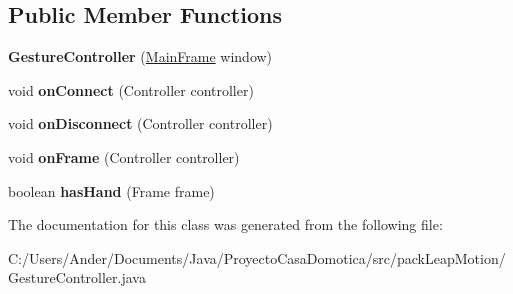 \subsection*{Public Member Functions}
\begin{DoxyCompactItemize}
\item 
\mbox{\label{classpack_leap_motion_1_1_gesture_controller_a8315f6be678b327266d0c3926ce26133}} 
{\bfseries Gesture\+Controller} (\mbox{\hyperlink{classpack_interface_1_1_main_frame}{Main\+Frame}} window)
\item 
\mbox{\label{classpack_leap_motion_1_1_gesture_controller_a9998ec8be3ea657d06cf775c02388d9f}} 
void {\bfseries on\+Connect} (Controller controller)
\item 
\mbox{\label{classpack_leap_motion_1_1_gesture_controller_a1cdf76d24a13ff0a90aad04325c9453b}} 
void {\bfseries on\+Disconnect} (Controller controller)
\item 
\mbox{\label{classpack_leap_motion_1_1_gesture_controller_aea88530c7a99ed756b4aa46bf290a950}} 
void {\bfseries on\+Frame} (Controller controller)
\item 
\mbox{\label{classpack_leap_motion_1_1_gesture_controller_a5d5126bf0481a7dd37fa411b0b7382a5}} 
boolean {\bfseries has\+Hand} (Frame frame)
\end{DoxyCompactItemize}


The documentation for this class was generated from the following file\+:\begin{DoxyCompactItemize}
\item 
C\+:/\+Users/\+Ander/\+Documents/\+Java/\+Proyecto\+Casa\+Domotica/src/pack\+Leap\+Motion/Gesture\+Controller.\+java\end{DoxyCompactItemize}
